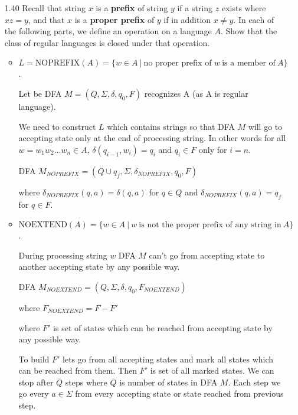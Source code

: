 \begin{enumerate}
    \item [1.40]
          Recall that string $x$ is a \textbf{prefix} of string $y$ if a string $z$ exists where $xz = y$, and that $x$ is a \textbf{proper prefix} of $y$ if in addition $x \neq y$. In each of the following parts, we define an operation on a language $A$. Show that the class of regular languages is closed under that operation.
          \begin{itemize}
              \item $L = \text{NOPREFIX}(A)=\{w \in A~|~\text{no proper prefix of } w~ \text{is a member of}~ A\}$.

                    Let be DFA $M = (Q, \Sigma, \delta, q_0, F)$ recognizes A (as A is regular language).

                    We need to construct $L$ which contains strings so that DFA $M$ will go to accepting state only at the end of processing string. In other words for all $w = w_1w_2\ldots w_n \in A$, $\delta(q_{i-1}, w_i) = q_{i}$ and $q_i \in F$ only for $i = n$.

                    DFA $M_{NOPREFIX} = (Q \cup {q_f}, \Sigma, \delta_{NOPREFIX}, q_0, F)$

                    where $\delta_{NOPREFIX}(q, a) = \delta(q, a)$ for $q \in Q$ and $\delta_{NOPREFIX}(q, a) = q_f$ for $q \in F$.


              \item $\text{NOEXTEND}(A)=\{w \in A~|~w~ \text{is not the proper prefix of any string in}~ A\}$.

                    During processing string $w$ DFA $M$ can't go from accepting state to another accepting state by any possible way.

                    DFA $M_{NOEXTEND} = (Q, \Sigma, \delta, q_0, F_{NOEXTEND})$

                    where $F_{NOEXTEND} = F - F'$

                    where $F'$ is set of states which can be reached from accepting state by any possible way.

                    To build $F'$ lets go from all accepting states and mark all states which can be reached from them. Then $F'$ is set of all marked states. We can stop after $\overline{Q}$ steps where $\overline{Q}$ is number of states in DFA $M$. Each step we go every $a \in \Sigma$ from every accepting state or state reached from previous step.
          \end{itemize}
\end{enumerate}
